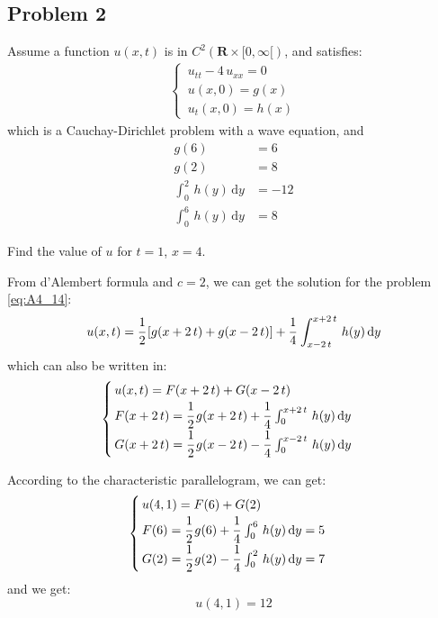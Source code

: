 \documentclass[../main.tex]{subfiles}
\begin{document}
\subsection{Problem 2}

Assume a function $u(x, t)$ is in $C^2(\mathbf{R} \times [0, \infty[)$, and satisfies:
\begin{align}
    \begin{cases} \label{eq:A4_14}
        \, u_{tt} - 4 \, u_{xx} = 0 \\
        \, u(x, 0) = g(x) \\
        \, u_t(x, 0) = h(x) 
    \end{cases}
\end{align}
which is a Cauchay-Dirichlet problem with a wave equation, and
\begin{align}
    g(6) &= 6 \label{eq:A4_15} \\
    g(2) &= 8 \label{eq:A4_16} \\
    \int_0^2 \, h(y) \, \mathrm{d} y &= - 12 \label{eq:A4_17} \\
    \int_0^6 \, h(y) \, \mathrm{d} y &= 8 \label{eq:A4_18}
\end{align}

Find the value of $u$ for $t = 1$, $x = 4$.

From d'Alembert formula and $c = 2$, we can get the solution for the problem \ref{eq:A4_14}:
\begin{equation} \label{eq:A4_19}
    u(x ,t) = \cfrac{1}{2} \, [g(x + 2 \, t) + g(x - 2 \, t)] + \cfrac{1}{4} \, \int_{x - 2 \, t}^{x + 2 \, t} \, h(y) \, \mathrm{d} y
\end{equation}
which can also be written in:
\begin{align}
    \begin{cases} \label{eq:A4_20}
        \, u(x ,t) = F(x + 2 \, t) + G(x - 2 \, t) \\
        \, F(x + 2 \, t) = \cfrac{1}{2} \, g(x + 2 \, t) + \cfrac{1}{4} \, \int_{0}^{x + 2 \, t} \, h(y) \, \mathrm{d} y \\
        \, G(x + 2 \, t) = \cfrac{1}{2} \, g(x - 2 \, t) - \cfrac{1}{4} \, \int_{0}^{x - 2 \, t} \, h(y) \, \mathrm{d} y
    \end{cases}
\end{align}

According to the characteristic parallelogram, we can get:
\begin{align}
    \begin{cases} \label{eq:A4_21}
        \, u(4,1) = F(6) + G(2) \\
        \, F(6) = \cfrac{1}{2} \, g(6) + \cfrac{1}{4} \, \int_{0}^{6} \, h(y) \, \mathrm{d} y = 5 \\
        \, G(2) = \cfrac{1}{2} \, g(2) - \cfrac{1}{4} \, \int_{0}^{2} \, h(y) \, \mathrm{d} y = 7
    \end{cases}
\end{align}
and we get:
\begin{equation} \label{eq:A4_22}
    u(4,1) = 12
\end{equation}
\end{document}
